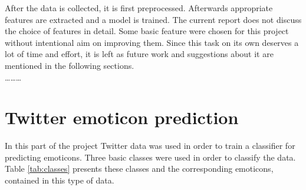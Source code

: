 \documentclass{article} %
\begin{document}
\noindent After the data is collected, it is first preprocessed. Afterwards appropriate features are extracted and a model is trained. The current report does not discuss the choice of features in detail. Some basic feature were chosen for this project without intentional aim on improving them. Since this task on its own deserves a lot of time and effort, it is left as future work and suggestions about it are mentioned in the following sections. \\

\ldots \ldots \ldots 





\section{Twitter emoticon prediction}

\begin{comment}
Approach (roughly 2-3 pages)
• Explain the model; if any important assumptions are made at this stage, explain why they are
reasonable or necessary
• Explain learning / inference algorithms
• Explaining (perhaps briefly) any necessary preprocessing / postprocesing / data acquisition stages
(maybe earlier, depending on the project; may also move to the experimental section)
\end{comment}


In this part of the project Twitter data was used in order to train a classifier for predicting emoticons. Three basic classes were used in order to classify the data. Table \ref{tab:classes} presents these classes and the corresponding emoticons, contained in this type of data.


\begin{comment}
\begin{itemize}
\item \textbf{positive} - data containing `positive' emoticons (expressing positive emotions) such as `:)', `:]', `=)', or `:D'
\item \textbf{neutral} - data containing no emoticons or neutral emoticons like `:$\vert$' or `o\_o'
\item \textbf{negative} - data containing `negative' emoticons (expressing negative emotions) such as `:(', `:[', `=(` or `;(' 
\end{itemize}
\end{comment}
\end{document}
